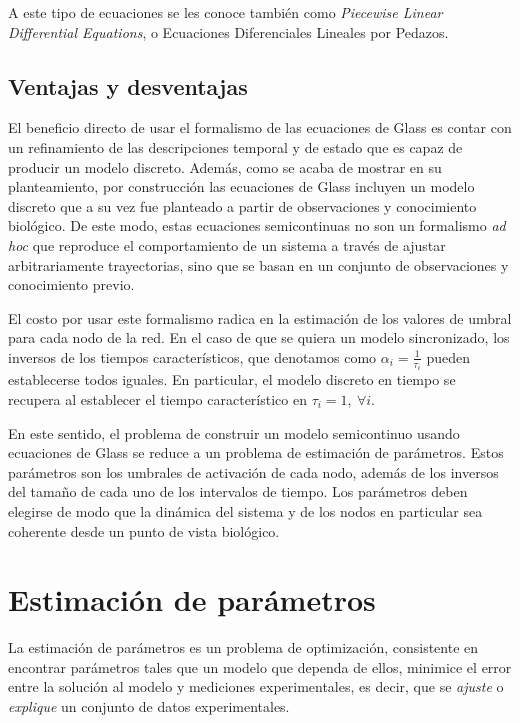 A este tipo de ecuaciones se les conoce también como \emph{Piecewise Linear Differential Equations}, o Ecuaciones Diferenciales Lineales por Pedazos.

\subsection{Ventajas y desventajas}

El beneficio directo de usar el formalismo de las ecuaciones de Glass es contar con un refinamiento de las descripciones temporal y de estado que es capaz de producir un modelo discreto. Además, como se acaba de mostrar en su planteamiento, por construcción las ecuaciones de Glass incluyen un modelo discreto que a su vez fue planteado a partir de observaciones y conocimiento biológico. De este modo, estas ecuaciones semicontinuas no son un formalismo \emph{ad hoc} que reproduce el comportamiento de un sistema a través de ajustar arbitrariamente trayectorias, sino que se basan en un conjunto de observaciones y conocimiento previo.

El costo por usar este formalismo radica en la estimación de los valores de umbral para cada nodo de la red. En el caso de que se quiera un modelo sincronizado, los inversos de los tiempos característicos, que denotamos como $\alpha_i=\frac{1}{\tau_i}$ pueden establecerse todos iguales. En particular, el modelo discreto en tiempo se recupera al establecer el tiempo característico en $\tau_i = 1,\ \forall i$.

En este sentido, el problema de construir un modelo semicontinuo usando ecuaciones de Glass se reduce a un problema de estimación de parámetros. Estos parámetros son los umbrales de activación de cada nodo, además de los inversos del tamaño de cada uno de los intervalos de tiempo. Los parámetros deben elegirse de modo que la dinámica del sistema y de los nodos en particular sea coherente desde un punto de vista biológico.

\section{Estimación de parámetros}

La estimación de parámetros es un problema de optimización, consistente en encontrar parámetros tales que un modelo que dependa de ellos, minimice el error entre la solución al modelo y mediciones experimentales, es decir, que se \emph{ajuste} o \emph{explique} un conjunto de datos experimentales.

